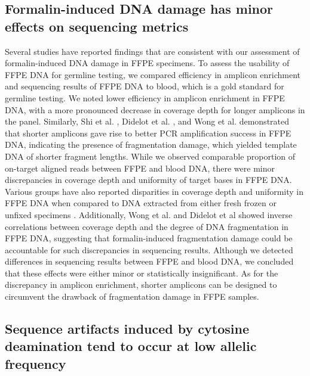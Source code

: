 \subsection{Formalin-induced DNA damage has minor effects on sequencing metrics}

Several studies have reported findings that are consistent with our assessment of formalin-induced DNA damage in FFPE specimens. To assess the usability of FFPE DNA for germline testing, we compared efficiency in amplicon enrichment and sequencing results of FFPE DNA to blood, which is a gold standard for germline testing. We noted lower efficiency in amplicon enrichment in FFPE DNA, with a more pronounced decrease in coverage depth for longer amplicons in the panel. Similarly, Shi et al. \cite{Shi2002}, Didelot et al. \cite{Didelot2013}, and Wong et al. \cite{Wong2013} demonstrated that shorter amplicons gave rise to better PCR amplification success in FFPE DNA, indicating the presence of fragmentation damage, which yielded template DNA of shorter fragment lengths. While we observed comparable proportion of on-target aligned reads between FFPE and blood DNA, there were minor discrepancies in coverage depth and uniformity of target bases in FFPE DNA. Various groups have also reported disparities in coverage depth and uniformity in FFPE DNA when compared to DNA extracted from either fresh frozen or unfixed specimens \cite{Wong2013, Betge2015, Spencer2013}. Additionally, Wong et al. \cite{Wong2014} and Didelot et al \cite{Didelot2013} showed inverse correlations between coverage depth and the degree of DNA fragmentation in FFPE DNA, suggesting that formalin-induced fragmentation damage could be accountable for such discrepancies in sequencing results. Although we detected differences in sequencing results between FFPE and blood DNA, we concluded that these effects were either minor or statistically insignificant. As for the discrepancy in amplicon enrichment, shorter amplicons can be designed to circumvent the drawback of fragmentation damage in FFPE samples.

\subsection{Sequence artifacts induced by cytosine deamination tend to occur at low allelic frequency}

